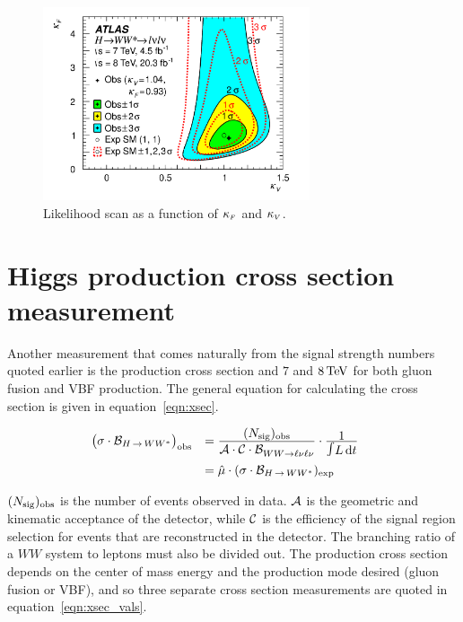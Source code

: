 \begin{figure}[h!]
  \centering
  \captionsetup{justification=centering}

  \includegraphics[width=0.7\textwidth]{figures/kappas}
  \caption{Likelihood scan as a function of $\kappa_{\mbox{\tiny $F$}}$ and $\kappa_{\mbox{\tiny $V$}}$\cite{WW2015}.}
  \label{fig:kappas}
\end{figure}

\section{Higgs production cross section measurement}

Another measurement that comes naturally from the signal strength numbers quoted earlier is the production cross section and $7$ and $8 \TeV$ for both gluon fusion and VBF production. The general equation for calculating the cross section is given in equation~\ref{eqn:xsec}. 

\begin{equation}
\begin{array}{ll}
\nq\big(\sigma \cdot\mathcal{B}_{\HWW}\big)_\obs
&=
\frac{\displaystyle (\Nsig)_\obs}
     {\displaystyle \Acc\cdot\Cor\cdot\mathcal{B}_{WW\rightarrow \ell\nu\ell\nu}^{\phantom{X}}}
\cdot
\frac{\displaystyle 1}{\displaystyle\Lint} \\
\clineskip
\clineskip
&= 
{\displaystyle \hat{\mu} \cdot (\sigma\cdot\mathcal{B}_{\HWW})_\exp}
\end{array}
\label{eqn:xsec}
\end{equation}


$(N_{\rm sig})_{\rm obs}$ is the number of events observed in data. $\mathcal{A}$ is the geometric and kinematic acceptance of the detector, while $\mathcal{C}$ is the efficiency of the signal region selection for events that are reconstructed in the detector. The branching ratio of a $WW$ system to leptons must also be divided out. The production cross section depends on the center of mass energy and the production mode desired (gluon fusion or VBF), and so three separate cross section measurements are quoted in equation~\ref{eqn:xsec_vals}.

